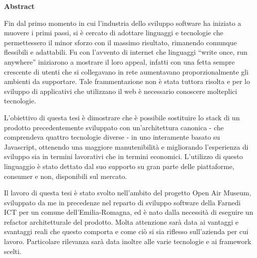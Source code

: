 \thispagestyle{empty}

\begin{flushleft}
	
  {\bf \Huge Abstract}

\vspace{4cm}

Fin dal primo momento in cui l’industria dello sviluppo software ha iniziato a muovere i primi passi, si è cercato di adottare linguaggi e tecnologie che permettessero il minor sforzo con il massimo risultato, rimanendo comunque flessibili e adattabili. Fu con l’avvento di internet che linguaggi “write once, run anywhere” iniziarono a mostrare il loro appeal, infatti con una fetta sempre crescente di utenti che si collegavano in rete aumentavano proporzionalmente gli ambienti da supportare. Tale frammentazione non è stata tuttora risolta e per lo sviluppo di applicativi che utilizzano il web è necessario conoscere molteplici tecnologie.\vspace{5mm}

\setlength{\parindent}{5ex}
L’obiettivo di questa tesi è dimostrare che è possibile sostituire lo stack di un prodotto precedentemente sviluppato con un'architettura canonica - che comprendeva quattro tecnologie diverse - in uno interamente basato su Javascript, ottenendo una maggiore manutenibilità e migliorando l’esperienza di sviluppo sia in termini lavorativi che in termini economici. L’utilizzo di questo linguaggio è stato dettato dal suo supporto su gran parte delle piattaforme, consumer e non, disponibili sul mercato.\vspace{5mm}

Il lavoro di questa tesi è stato svolto nell’ambito del progetto Open Air Museum, sviluppato da me in precedenze nel reparto di sviluppo software della Farnedi ICT per un comune dell’Emilia-Romagna, ed è nato dalla necessità di eseguire un refactor architetturale del prodotto.  Molta attenzione sarà data ai vantaggi e svantaggi reali che questo comporta e come ciò si sia riflesso sull’azienda per cui lavoro. Particolare rilevanza sarà data inoltre alle varie tecnologie e ai framework scelti.

\end{flushleft}